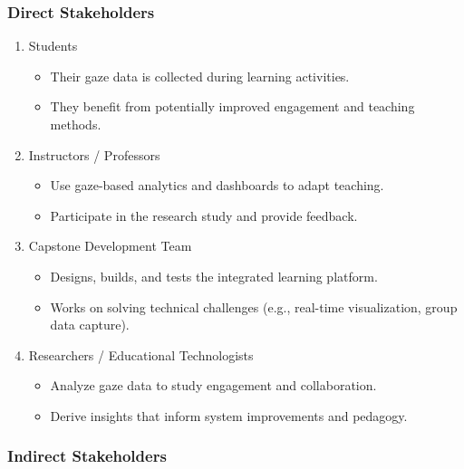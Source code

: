 \documentclass{article}
\begin{document}
\subsubsection*{Direct Stakeholders}

\begin{enumerate}
    \item Students
    \begin{itemize}
        \item Their gaze data is collected during learning activities.
        \item They benefit from potentially improved engagement and teaching methods.
    \end{itemize}

    \item Instructors / Professors
    \begin{itemize}
        \item Use gaze-based analytics and dashboards to adapt teaching.
        \item Participate in the research study and provide feedback.
    \end{itemize}

    \item Capstone Development Team
    \begin{itemize}
        \item Designs, builds, and tests the integrated learning platform.
        \item Works on solving technical challenges (e.g., real-time visualization, group data capture).
    \end{itemize}

    \item Researchers / Educational Technologists
    \begin{itemize}
        \item Analyze gaze data to study engagement and collaboration.
        \item Derive insights that inform system improvements and pedagogy.
    \end{itemize}
\end{enumerate}

\subsubsection*{Indirect Stakeholders}
\end{document}
